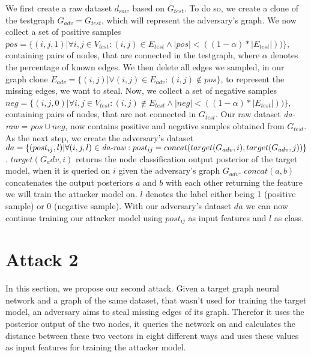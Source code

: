         We first create a raw dataset $d_{raw}$ based on $G_{test}$.
        To do so, we create a clone of the testgraph $G_{adv} = G_{test}$, which will represent the adversary's graph.
        We now collect a set of positive samples $pos = \{(i,j, 1) | \forall i,j \in V_{test}: (i,j) \in E_{test} \wedge |pos| < ((1 - \alpha) * |E_{test}|))\}$, containing pairs of nodes, that are connected in the testgraph, where $\alpha$ denotes the percentage of known edges.
        We then delete all edges we sampled, in our graph clone $E_{adv} = \{(i,j) | \forall (i,j) \in E_{adv}: (i,j) \not\in pos\}$, to represent the missing edges, we want to steal.
        Now, we collect a set of negative samples $neg = \{(i,j, 0) | \forall i,j \in V_{test}: (i,j) \not\in E_{test} \wedge |neg| < ((1 - \alpha) * |E_{test}|))\}$, containing pairs of nodes, that are not connected in $G_{test}$.
        Our raw dataset \emph{da-raw} = $pos \cup neg$, now contains positive and negative samples obtained from $G_{test}$.
        As the next step, we create the adversary's dataset $da = \{(post_{ij}, l) | \forall (i,j,l)\in\emph{da-raw}: post_{ij} = concat(target(G_{adv}, i), target(G_{adv}, j))\}$.
        $target(G_adv, i)$ returns the node classification output posterior of the target model, when it is queried on $i$ given the adversary's graph $G_{adv}$.
        $concat(a, b)$ concatenates the output posteriors $a$ and $b$ with each other returning the feature we will train the attacker model on.
        $l$ denotes the label either being 1 (positive sample) or 0 (negative sample).
        With our adversary's dataset $da$ we can now continue training our attacker model using $post_{ij}$ as input features and $l$ as class.

  \section{Attack 2}

    In this section, we propose our second attack. Given a target graph neural network and a graph of the same dataset, that wasn't used for training the target model, an adversary aims to steal missing edges of its graph.
    Therefor it uses the posterior output of the two nodes, it queries the network on and calculates the distance between these two vectors in eight different ways and uses these values as input features for training the attacker model.


